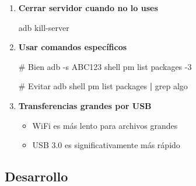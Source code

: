 \documentclass[
  doc,
  floatsintext,
  longtable,
  a4paper,
  nolmodern,
  notxfonts,
  notimes,
  12pt,
  colorlinks=true,linkcolor=blue,citecolor=blue,urlcolor=blue]{apa7}
\newenvironment{Shaded}{\begin{snugshade}}{\end{snugshade}}
\newcommand{\AttributeTok}[1]{\textcolor[rgb]{0.40,0.45,0.13}{#1}}
\newcommand{\CommentTok}[1]{\textcolor[rgb]{0.37,0.37,0.37}{#1}}
\newcommand{\ExtensionTok}[1]{\textcolor[rgb]{0.00,0.23,0.31}{#1}}
\newcommand{\FunctionTok}[1]{\textcolor[rgb]{0.28,0.35,0.67}{#1}}
\newcommand{\KeywordTok}[1]{\textcolor[rgb]{0.00,0.23,0.31}{\textbf{#1}}}
\newcommand{\NormalTok}[1]{\textcolor[rgb]{0.00,0.23,0.31}{#1}}
\providecommand{\tightlist}{%
  \setlength{\itemsep}{0pt}\setlength{\parskip}{0pt}}
\begin{document}
\begin{enumerate}
\def\labelenumi{\arabic{enumi}.}
\item
  \textbf{Cerrar servidor cuando no lo uses}

\begin{Shaded}
\begin{Highlighting}[]
\ExtensionTok{adb}\NormalTok{ kill{-}server}
\end{Highlighting}
\end{Shaded}
\item
  \textbf{Usar comandos específicos}

\begin{Shaded}
\begin{Highlighting}[]
\CommentTok{\# Bien}
\ExtensionTok{adb} \AttributeTok{{-}s}\NormalTok{ ABC123 shell pm list packages }\AttributeTok{{-}3}

\CommentTok{\# Evitar}
\ExtensionTok{adb}\NormalTok{ shell pm list packages }\KeywordTok{|} \FunctionTok{grep}\NormalTok{ algo}
\end{Highlighting}
\end{Shaded}
\item
  \textbf{Transferencias grandes por USB}

  \begin{itemize}
  \tightlist
  \item
    WiFi es más lento para archivos grandes
  \item
    USB 3.0 es significativamente más rápido
  \end{itemize}
\end{enumerate}

\subsection{Desarrollo}\label{desarrollo}
\end{document}
